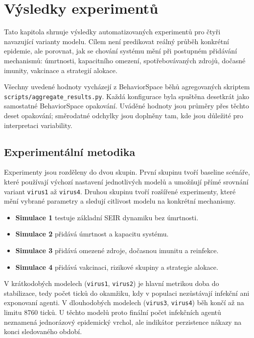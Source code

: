 \documentclass{article}
\begin{document}
\section{Výsledky experimentů}

Tato kapitola shrnuje výsledky automatizovaných experimentů pro čtyři navazující
varianty modelu. Cílem není predikovat reálný průběh konkrétní epidemie, ale
porovnat, jak se chování systému mění při postupném přidávání mechanismů:
úmrtnosti, kapacitního omezení, spotřebovávaných zdrojů, dočasné imunity,
vakcinace a strategií alokace.

Všechny uvedené hodnoty vycházejí z BehaviorSpace běhů agregovaných skriptem
\texttt{scripts/aggregate\_results.py}. Každá konfigurace byla spuštěna
desetkrát jako samostatné BehaviorSpace opakování. Uváděné hodnoty jsou průměry
přes těchto deset opakování; směrodatné odchylky jsou doplněny tam, kde jsou
důležité pro interpretaci variability.

\subsection{Experimentální metodika}

Experimenty jsou rozděleny do dvou skupin. První skupinu tvoří baseline scénáře,
které používají výchozí nastavení jednotlivých modelů a umožňují přímé
srovnání variant \texttt{virus1} až \texttt{virus4}. Druhou skupinu tvoří
rozšířené experimenty, které mění vybrané parametry a sledují citlivost modelu
na konkrétní mechanismy.

\begin{itemize}
\item \textbf{Simulace 1} testuje základní SEIR dynamiku bez úmrtnosti.
\item \textbf{Simulace 2} přidává úmrtnost a kapacitu systému.
\item \textbf{Simulace 3} přidává omezené zdroje, dočasnou imunitu a reinfekce.
\item \textbf{Simulace 4} přidává vakcinaci, rizikové skupiny a strategie alokace.
\end{itemize}

V krátkodobých modelech (\texttt{virus1}, \texttt{virus2}) je hlavní metrikou
doba do stabilizace, tedy počet ticků do okamžiku, kdy v populaci nezůstávají
infekční ani exponovaní agenti. V dlouhodobých modelech (\texttt{virus3},
\texttt{virus4}) běh končí až na limitu 8760 ticků. U těchto modelů proto
finální počet infekčních agentů neznamená jednorázový epidemický vrchol, ale
indikátor perzistence nákazy na konci sledovaného období.
\end{document}

